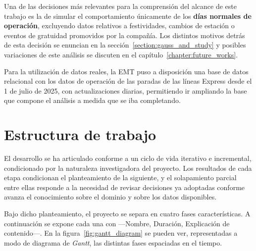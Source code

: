 Una de las decisiones más relevantes para la comprensión del alcance de este trabajo es la 
de simular el comportamiento únicamente de los \textbf{días normales de operación}, excluyendo
datos relativos a festividades, cambios de estación o eventos de gratuidad promovidos por la compañía. 
Los distintos motivos detrás de esta decisión se enuncian en la sección~\ref{section:gauss_and_study} 
y posibles variaciones de este análisis se discuten en el capítulo~\ref{chapter:future_works}.

Para la utilización de datos reales, la EMT puso a disposición una base de datos relacional 
con los datos de operación de las paradas de las líneas Express desde el 1 de julio de 2025, con 
actualizaciones diarias, permitiendo ir ampliando la base que compone el análisis a medida que se iba 
completando.

\section{Estructura de trabajo}\label{subsec:structure}
El desarrollo se ha articulado conforme a un ciclo de vida iterativo e incremental,
condicionado por la naturaleza investigadora del proyecto. Los resultados de cada etapa
condicionan el planteamiento de la siguiente, y el solapamiento parcial entre ellas responde
a la necesidad de revisar decisiones ya adoptadas conforme avanza el conocimiento sobre el
dominio y sobre los datos disponibles.

Bajo dicho planteamiento, el proyecto se separa en cuatro fases características. A
continuación se expone cada una con ---Nombre, Duración, Explicación de contenido---. En la
figura~\ref{fig:gantt_diagram} se pueden ver, representadas a modo de diagrama de
\textit{Gantt}, las distintas fases espaciadas en el tiempo.

